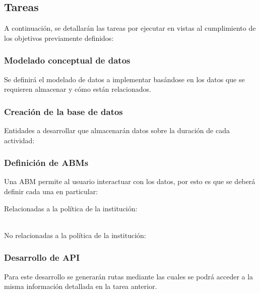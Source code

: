 
\subsection{Tareas}%
\label{sub:tareas}
A continuación, se detallarán las tareas por ejecutar en vistas al cumplimiento de los objetivos previamente definidos:

\subsubsection{Modelado conceptual de datos}%
\label{ssub:modelado_conceptual_de_datos}
Se definirá el modelado de datos a implementar basándose en los datos que se requieren almacenar y cómo están relacionados.

\subsubsection{Creación de la base de datos}
\label{ssub:creacionDB}

Entidades a desarrollar que almacenarán datos  sobre la duración de cada actividad:

\begin{itemize}
    
\end{itemize}

\subsubsection{Definición de ABMs}%
\label{ssub:definición_de_abms}


Una ABM permite al usuario interactuar con los datos, por esto es que se deberá definir cada una en particular:\newline

Relacionadas a la política de la institución:
\begin{itemize}
    
\end{itemize}
\ \\No relacionadas a la política de la institución:
\begin{itemize}
    
\end{itemize}

\subsubsection{Desarrollo de API }%
\label{ssub:desarrollo_de_api_}
Para este desarrollo se generarán rutas mediante las cuales se podrá acceder a la misma información detallada en la tarea anterior.

